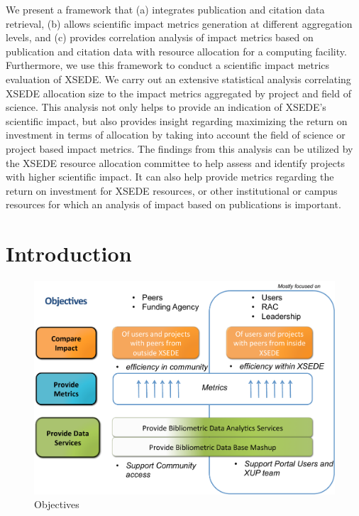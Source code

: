 \documentclass{sig-alternate}
\begin{document}
We present a framework that (a) integrates publication and citation
data retrieval, (b) allows scientific impact metrics generation at
different aggregation levels, and (c) provides correlation analysis of
impact metrics based on publication and citation data with resource
allocation for a computing facility. Furthermore, we use this
framework to conduct a scientific impact metrics evaluation of XSEDE.
We carry out an extensive statistical analysis correlating XSEDE
allocation size to the impact metrics aggregated by project and field
of science. This analysis not only helps to provide an indication of
XSEDE's scientific impact, but also provides insight regarding
maximizing the return on investment in terms of allocation by taking
into account the field of science or project based impact metrics. The
findings from this analysis can be utilized by the XSEDE resource
allocation committee to help assess and identify projects with higher
scientific impact. It can also help provide metrics regarding the
return on investment for XSEDE resources, or other institutional or
campus resources for which an analysis of impact based on publications
is important.
 
\cite{las2014impact}




\section{Introduction}


\begin{figure}[htb] 
  \centering 
    \includegraphics[width=1.0\columnwidth]{images-new/objectives.pdf} 
  \caption{Objectives}\label{F:objectives} 
\end{figure} 
 
\end{document}
